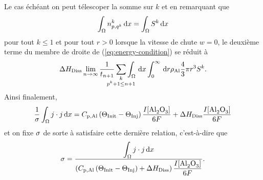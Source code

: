 Le cas échéant on peut télescoper la somme sur $k$ et en remarquant que
\begin{equation*}
  \int_\Omega n_{p,q^k}^k\,\mathrm dx = \int_\Omega S^k\,\mathrm dx
\end{equation*}
pour tout $k \leq 1$ et pour tout $r > 0$ lorsque la vitesse de chute
$w = 0$, le deuxième terme du membre de droite de
(\ref{eq:energy-condition}) se réduit à
\begin{equation*}
  {\aluminadissolutionenthalpy}\lim_{n\to\infty}\frac{1}{t_{n+1}}\sum_{\mathclap{\substack{k\\ p^k +
  1 \leq n + 1}}}\int_\Omega\intd{x}\int_0^\infty\intd{r}\aluminadensity
  \frac{4}{3}\pi r^3 S^k.
\end{equation*}
Ainsi finalement,
\begin{equation*}
  \frac{1}{\sigma}\int_\Omega j\cdot j\intd{x}
  =\aluminahc\parent{\tinit-\tinj}\frac{I[\cee{Al2O3}]}{6F} + {\aluminadissolutionenthalpy}\frac{I[\cee{Al2O3}]}{6F}
\end{equation*}
et on fixe $\sigma$ de sorte à satisfaire cette dernière
relation, c'est-à-dire que
\begin{equation}\label{eq:conductivity-condition}
  \conductivity = \frac{\displaystyle\int_\Omega j\cdot j\intd{x}}{\parent{\aluminahc\parent{\tinit-\tinj} + {\aluminadissolutionenthalpy} }
    \displaystyle\frac{I[\cee{Al2O3}]}{6F}}.
\end{equation}

